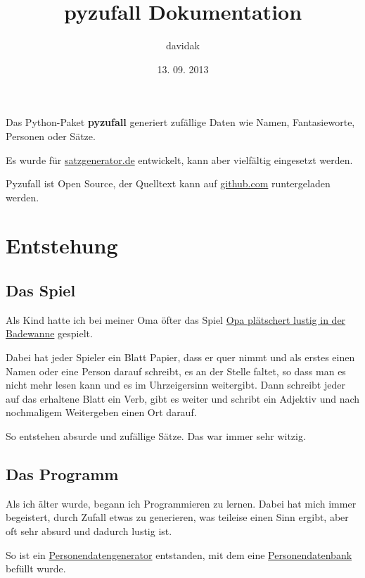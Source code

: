 \documentclass[a4paper,12pt,oneside]{sphinxmanual}
\title{pyzufall Dokumentation}
\date{13. 09. 2013}
\author{davidak}
\begin{document}
\maketitle
\tableofcontents
{}\label{index::doc}


Das Python-Paket \textbf{pyzufall} generiert zufällige Daten wie Namen, Fantasieworte, Personen oder Sätze.

Es wurde für \href{http://satzgenerator.de/}{satzgenerator.de} entwickelt, kann aber vielfältig eingesetzt werden.

Pyzufall ist Open Source, der Quelltext kann auf \href{https://github.com/davidak/pyzufall/}{github.com} runtergeladen werden.


\chapter{Entstehung}
\label{entstehung::doc}\label{entstehung:entstehung}\label{entstehung:dokumentation-von-pyzufall}

\section{Das Spiel}
\label{entstehung:das-spiel}
Als Kind hatte ich bei meiner Oma öfter das Spiel \href{http://www.mama-tipps.de/tipp/Opa-plaetschert-Badewanne.html}{Opa plätschert lustig in der Badewanne} gespielt.

Dabei hat jeder Spieler ein Blatt Papier, dass er quer nimmt und als erstes einen Namen oder eine Person darauf schreibt, es an der Stelle faltet, so dass man es nicht mehr lesen kann und es im Uhrzeigersinn weitergibt. Dann schreibt jeder auf das erhaltene Blatt ein Verb, gibt es weiter und schribt ein Adjektiv und nach nochmaligem Weitergeben einen Ort darauf.

So entstehen absurde und zufällige Sätze. Das war immer sehr witzig.


\section{Das Programm}
\label{entstehung:das-programm}
Als ich älter wurde, begann ich Programmieren zu lernen. Dabei hat mich immer begeistert, durch Zufall etwas zu generieren, was teileise einen Sinn ergibt, aber oft sehr absurd und dadurch lustig ist.

So ist ein \href{http://davidak.de/wiki/perl/personendatengenerator}{Personendatengenerator} entstanden, mit dem eine \href{http://davidak.de/personen/}{Personendatenbank} befüllt wurde.
\end{document}
